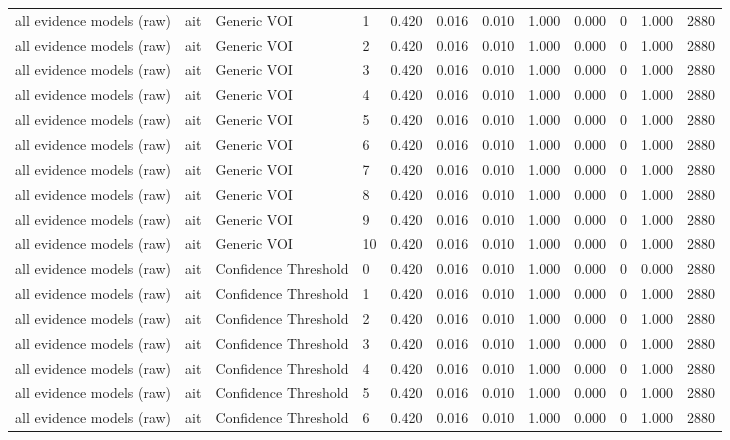 \begin{table}[!ht]
{\begin{tabular}{llllllllllll}
all evidence models (raw) & ait & Generic VOI & 1 & 0.420 & 0.016 & 0.010 & 1.000 & 0.000 & 0 & 1.000 & 2880 \\
all evidence models (raw) & ait & Generic VOI & 2 & 0.420 & 0.016 & 0.010 & 1.000 & 0.000 & 0 & 1.000 & 2880 \\
all evidence models (raw) & ait & Generic VOI & 3 & 0.420 & 0.016 & 0.010 & 1.000 & 0.000 & 0 & 1.000 & 2880 \\
all evidence models (raw) & ait & Generic VOI & 4 & 0.420 & 0.016 & 0.010 & 1.000 & 0.000 & 0 & 1.000 & 2880 \\
all evidence models (raw) & ait & Generic VOI & 5 & 0.420 & 0.016 & 0.010 & 1.000 & 0.000 & 0 & 1.000 & 2880 \\
all evidence models (raw) & ait & Generic VOI & 6 & 0.420 & 0.016 & 0.010 & 1.000 & 0.000 & 0 & 1.000 & 2880 \\
all evidence models (raw) & ait & Generic VOI & 7 & 0.420 & 0.016 & 0.010 & 1.000 & 0.000 & 0 & 1.000 & 2880 \\
all evidence models (raw) & ait & Generic VOI & 8 & 0.420 & 0.016 & 0.010 & 1.000 & 0.000 & 0 & 1.000 & 2880 \\
all evidence models (raw) & ait & Generic VOI & 9 & 0.420 & 0.016 & 0.010 & 1.000 & 0.000 & 0 & 1.000 & 2880 \\
all evidence models (raw) & ait & Generic VOI & 10 & 0.420 & 0.016 & 0.010 & 1.000 & 0.000 & 0 & 1.000 & 2880 \\
all evidence models (raw) & ait & Confidence Threshold & 0 & 0.420 & 0.016 & 0.010 & 1.000 & 0.000 & 0 & 0.000 & 2880 \\
all evidence models (raw) & ait & Confidence Threshold & 1 & 0.420 & 0.016 & 0.010 & 1.000 & 0.000 & 0 & 1.000 & 2880 \\
all evidence models (raw) & ait & Confidence Threshold & 2 & 0.420 & 0.016 & 0.010 & 1.000 & 0.000 & 0 & 1.000 & 2880 \\
all evidence models (raw) & ait & Confidence Threshold & 3 & 0.420 & 0.016 & 0.010 & 1.000 & 0.000 & 0 & 1.000 & 2880 \\
all evidence models (raw) & ait & Confidence Threshold & 4 & 0.420 & 0.016 & 0.010 & 1.000 & 0.000 & 0 & 1.000 & 2880 \\
all evidence models (raw) & ait & Confidence Threshold & 5 & 0.420 & 0.016 & 0.010 & 1.000 & 0.000 & 0 & 1.000 & 2880 \\
all evidence models (raw) & ait & Confidence Threshold & 6 & 0.420 & 0.016 & 0.010 & 1.000 & 0.000 & 0 & 1.000 & 2880 \\

\end{tabular}}
\end{table}
